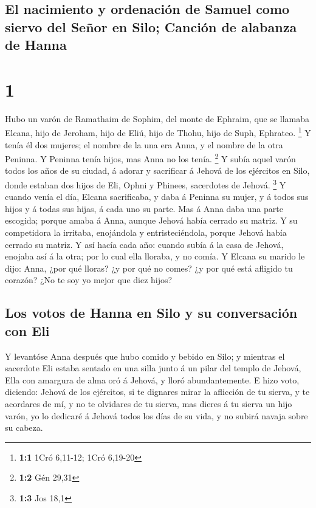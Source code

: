 \hypertarget{el-nacimiento-y-ordenaciuxf3n-de-samuel-como-siervo-del-seuxf1or-en-silo-canciuxf3n-de-alabanza-de-hanna}{%
\subsection{El nacimiento y ordenación de Samuel como siervo del Señor
en Silo; Canción de alabanza de
Hanna}\label{el-nacimiento-y-ordenaciuxf3n-de-samuel-como-siervo-del-seuxf1or-en-silo-canciuxf3n-de-alabanza-de-hanna}}

\hypertarget{section}{%
\section{1}\label{section}}

 Hubo un varón de Ramathaim de Sophim, del monte de
Ephraim, que se llamaba Elcana, hijo de Jeroham, hijo de Eliú, hijo de
Thohu, hijo de Suph, Ephrateo. \footnote{\textbf{1:1} 1Cró 6,11-12; 1Cró
  6,19-20}  Y tenía él dos mujeres; el nombre de la una
era Anna, y el nombre de la otra Peninna. Y Peninna tenía hijos, mas
Anna no los tenía. \footnote{\textbf{1:2} Gén 29,31}  Y
subía aquel varón todos los años de su ciudad, á adorar y sacrificar á
Jehová de los ejércitos en Silo, donde estaban dos hijos de Eli, Ophni y
Phinees, sacerdotes de Jehová. \footnote{\textbf{1:3} Jos 18,1}
 Y cuando venía el día, Elcana sacrificaba, y daba á
Peninna su mujer, y á todos sus hijos y á todas sus hijas, á cada uno su
parte.  Mas á Anna daba una parte escogida; porque amaba á
Anna, aunque Jehová había cerrado su matriz.  Y su
competidora la irritaba, enojándola y entristeciéndola, porque Jehová
había cerrado su matriz.  Y así hacía cada año: cuando
subía á la casa de Jehová, enojaba así á la otra; por lo cual ella
lloraba, y no comía.  Y Elcana su marido le dijo: Anna,
¿por qué lloras? ¿y por qué no comes? ¿y por qué está afligido tu
corazón? ¿No te soy yo mejor que diez hijos?

\hypertarget{los-votos-de-hanna-en-silo-y-su-conversaciuxf3n-con-eli}{%
\subsection{Los votos de Hanna en Silo y su conversación con
Eli}\label{los-votos-de-hanna-en-silo-y-su-conversaciuxf3n-con-eli}}

 Y levantóse Anna después que hubo comido y bebido en
Silo; y mientras el sacerdote Eli estaba sentado en una silla junto á un
pilar del templo de Jehová,  Ella con amargura de alma
oró á Jehová, y lloró abundantemente.  E hizo voto,
diciendo: Jehová de los ejércitos, si te dignares mirar la aflicción de
tu sierva, y te acordares de mí, y no te olvidares de tu sierva, mas
dieres á tu sierva un hijo varón, yo lo dedicaré á Jehová todos los días
de su vida, y no subirá navaja sobre su cabeza.

